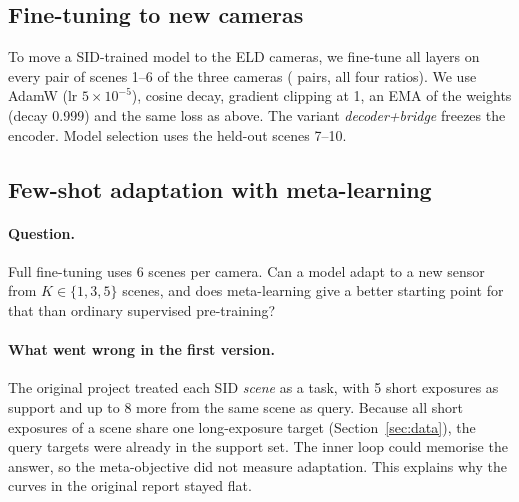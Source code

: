 \subsection{Fine-tuning to new cameras}
\label{sec:ft}
To move a SID-trained model to the ELD cameras, we fine-tune all layers on every pair of scenes 1--6 of the three cameras (\ELDFTPAIRS{} pairs, all four ratios). We use AdamW (lr $5\times10^{-5}$), cosine decay, gradient clipping at 1, an EMA of the weights (decay 0.999) and the same loss as above. The variant \emph{decoder+bridge} freezes the encoder. Model selection uses the held-out scenes 7--10.

\subsection{Few-shot adaptation with meta-learning}
\label{sec:meta}
\paragraph{Question.} Full fine-tuning uses 6 scenes per camera. Can a model adapt to a new sensor from $K\in\{1,3,5\}$ scenes, and does meta-learning give a better starting point for that than ordinary supervised pre-training?

\paragraph{What went wrong in the first version.} The original project treated each SID \emph{scene} as a task, with 5 short exposures as support and up to 8 more from the same scene as query. Because all short exposures of a scene share one long-exposure target (Section~\ref{sec:data}), the query targets were already in the support set. The inner loop could memorise the answer, so the meta-objective did not measure adaptation. This explains why the curves in the original report stayed flat.

